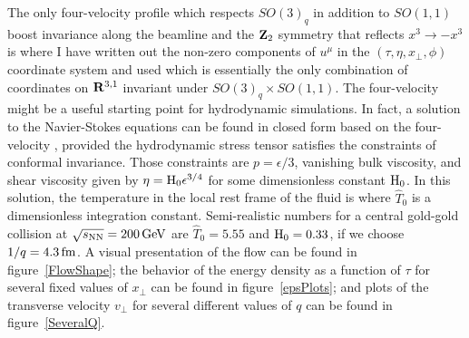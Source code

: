\documentclass[12pt]{article}
\begin{document}
The only four-velocity profile which respects $SO(3)_q$ in addition to $SO(1,1)$ boost invariance along the beamline and the ${\bf Z}_2$ symmetry that reflects $x^3 \to -x^3$ is
where I have written out the non-zero components of $u^\mu$ in the $(\tau,\eta,x_\perp,\phi)$ coordinate system and used
which is essentially the only combination of coordinates on ${\bf R}^{3,1}$ invariant under $SO(3)_q \times SO(1,1)$.  The four-velocity  might be a useful starting point for hydrodynamic simulations.  In fact, a solution to the Navier-Stokes equations can be found in closed form based on the four-velocity , provided the hydrodynamic stress tensor satisfies the constraints of conformal invariance.  Those constraints are $p = \epsilon/3$, vanishing bulk viscosity, and shear viscosity given by $\eta = {\rm H}_0 \epsilon^{3/4}$ for some dimensionless constant ${\rm H}_0$.  In this solution, the temperature in the local rest frame of the fluid is
where $\hat{T}_0$ is a dimensionless integration constant.  Semi-realistic numbers for a central gold-gold collision at $\sqrt{s_{\rm NN}} = 200\,{\rm GeV}$ are $\hat{T}_0 = 5.55$ and ${\rm H}_0 = 0.33$, if we choose $1/q = 4.3\,{\rm fm}$.  A visual presentation of the flow can be found in figure~\ref{FlowShape}; the behavior of the energy density as a function of $\tau$ for several fixed values of $x_\perp$ can be found in figure~\ref{epsPlots}; and plots of the transverse velocity $v_\perp$ for several different values of $q$ can be found in figure~\ref{SeveralQ}.
\end{document}
